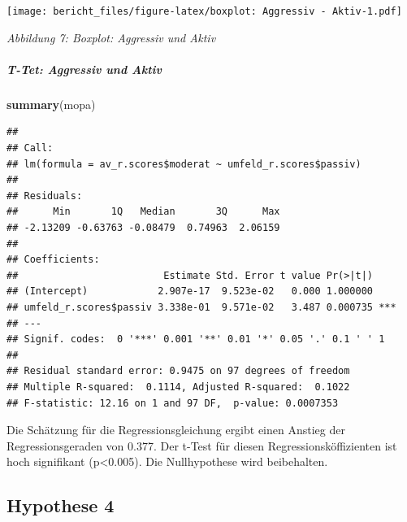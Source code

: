 \documentclass[]{article}
\newenvironment{Shaded}{\begin{snugshade}}{\end{snugshade}}
\newcommand{\KeywordTok}[1]{\textcolor[rgb]{0.13,0.29,0.53}{\textbf{{#1}}}}
\newcommand{\DataTypeTok}[1]{\textcolor[rgb]{0.13,0.29,0.53}{{#1}}}
\newcommand{\StringTok}[1]{\textcolor[rgb]{0.31,0.60,0.02}{{#1}}}
\newcommand{\NormalTok}[1]{{#1}}
\let\oldsubparagraph\subparagraph
\renewcommand{\subparagraph}[1]{\oldsubparagraph{#1}\mbox{}}
\begin{document}
\begin{Shaded}
\end{Shaded}

\texttt{[image: bericht\_files/figure-latex/boxplot: Aggressiv - Aktiv-1.pdf]}

\begin{center}
\textit{Abbildung 7: Boxplot: Aggressiv und Aktiv}
\bigskip
\end{center}

\subparagraph{T-Tet: Aggressiv und
Aktiv}\label{t-tet-aggressiv-und-aktiv}

\begin{Shaded}
\begin{Highlighting}[]
\KeywordTok{summary}\NormalTok{(mopa)}
\end{Highlighting}
\end{Shaded}

\begin{verbatim}
## 
## Call:
## lm(formula = av_r.scores$moderat ~ umfeld_r.scores$passiv)
## 
## Residuals:
##      Min       1Q   Median       3Q      Max 
## -2.13209 -0.63763 -0.08479  0.74963  2.06159 
## 
## Coefficients:
##                         Estimate Std. Error t value Pr(>|t|)    
## (Intercept)            2.907e-17  9.523e-02   0.000 1.000000    
## umfeld_r.scores$passiv 3.338e-01  9.571e-02   3.487 0.000735 ***
## ---
## Signif. codes:  0 '***' 0.001 '**' 0.01 '*' 0.05 '.' 0.1 ' ' 1
## 
## Residual standard error: 0.9475 on 97 degrees of freedom
## Multiple R-squared:  0.1114, Adjusted R-squared:  0.1022 
## F-statistic: 12.16 on 1 and 97 DF,  p-value: 0.0007353
\end{verbatim}

Die Schätzung für die Regressionsgleichung ergibt einen Anstieg der
Regressionsgeraden von 0.377. Der t-Test für diesen
Regressionsköffizienten ist hoch signifikant (p\textless{}0.005). Die
Nullhypothese wird beibehalten.

\subsection{Hypothese 4}\label{hypothese-4}
\end{document}
